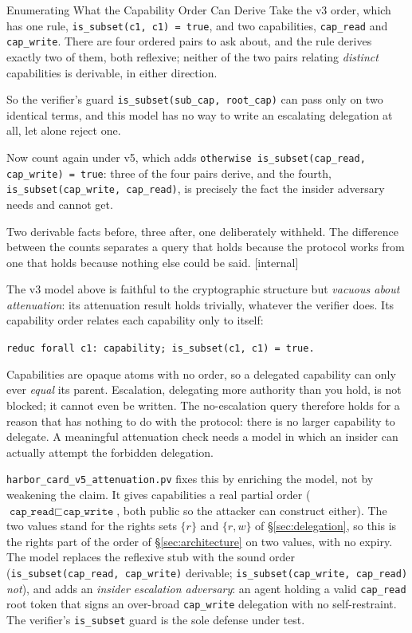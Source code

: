 \documentclass[11pt,a4paper]{article}
\theoremstyle{definition}
\begin{document}
\begin{pdexample}{Enumerating What the Capability Order Can Derive}
\setlength{\parskip}{4pt plus 1pt}
Take the v3 order, which has one rule, \texttt{is\_subset(c1, c1) = true}, and two
capabilities, \texttt{cap\_read} and \texttt{cap\_write}. There are four
ordered pairs to ask about, and the rule derives exactly two of them, both
reflexive; neither of the two pairs relating \emph{distinct} capabilities is
derivable, in either direction.

So the verifier's guard
\texttt{is\_subset(sub\_cap, root\_cap)} can pass only on two identical
terms, and this model has no way to write an escalating delegation at all,
let alone reject one.

Now count again under v5, which adds
\texttt{otherwise is\_subset(cap\_read, cap\_write) = true}: three of the four
pairs derive, and the fourth, \texttt{is\_subset(cap\_write, cap\_read)}, is
precisely the fact the insider adversary needs and cannot get.

Two derivable
facts before, three after, one deliberately withheld. The difference between
the counts separates a query that holds because the protocol works from one
that holds because nothing else could be said.
[internal]
\end{pdexample}

The v3 model above is faithful to the cryptographic structure but \emph{vacuous about
attenuation}: its attenuation result holds trivially, whatever the verifier
does. Its capability order relates each capability only to itself:
\begin{center}\texttt{reduc forall c1: capability; is\_subset(c1, c1) = true.}\end{center}
Capabilities are opaque atoms with no order, so a delegated capability can only
ever \emph{equal} its parent. Escalation, delegating more authority than you
hold, is not blocked; it cannot even be written. The no-escalation query
therefore holds for a reason that has nothing to do with the protocol: there is
no larger capability to delegate. A meaningful attenuation check needs a model
in which an insider can actually attempt the forbidden delegation.

\texttt{harbor\_card\_v5\_attenuation.pv} fixes this by enriching the model,
not by weakening the claim. It gives capabilities a real partial order
($\texttt{cap\_read} \sqsubset \texttt{cap\_write}$, both public so the
attacker can construct either). The two values stand for the rights sets
$\{r\}$ and $\{r,w\}$ of \S\ref{sec:delegation}, so this is the rights part of
the order of \S\ref{sec:architecture} on two values, with no expiry. The
model replaces the reflexive stub with the sound order
(\texttt{is\_subset(cap\_read, cap\_write)} derivable; \texttt{is\_subset(cap\_write,
cap\_read)} \emph{not}), and adds an \emph{insider escalation adversary}: an agent
holding a valid \texttt{cap\_read} root token that signs an over-broad
\texttt{cap\_write} delegation with no self-restraint. The verifier's
\texttt{is\_subset} guard is the sole defense under test.
\end{document}
